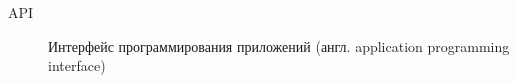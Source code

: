 \Abbreviations %
\begin{description}
\item[API] Интерфейс программирования приложений (англ. application programming interface)
\end{description}

